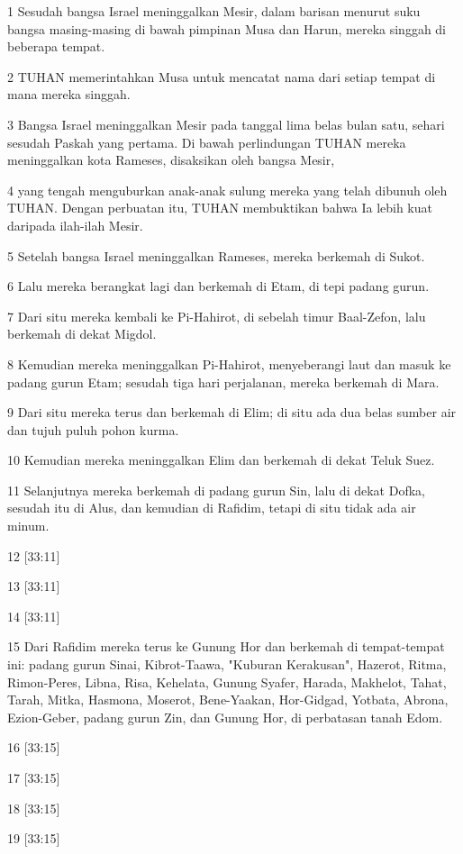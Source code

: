 \par 1 Sesudah bangsa Israel meninggalkan Mesir, dalam barisan menurut suku bangsa masing-masing di bawah pimpinan Musa dan Harun, mereka singgah di beberapa tempat.
\par 2 TUHAN memerintahkan Musa untuk mencatat nama dari setiap tempat di mana mereka singgah.
\par 3 Bangsa Israel meninggalkan Mesir pada tanggal lima belas bulan satu, sehari sesudah Paskah yang pertama. Di bawah perlindungan TUHAN mereka meninggalkan kota Rameses, disaksikan oleh bangsa Mesir,
\par 4 yang tengah menguburkan anak-anak sulung mereka yang telah dibunuh oleh TUHAN. Dengan perbuatan itu, TUHAN membuktikan bahwa Ia lebih kuat daripada ilah-ilah Mesir.
\par 5 Setelah bangsa Israel meninggalkan Rameses, mereka berkemah di Sukot.
\par 6 Lalu mereka berangkat lagi dan berkemah di Etam, di tepi padang gurun.
\par 7 Dari situ mereka kembali ke Pi-Hahirot, di sebelah timur Baal-Zefon, lalu berkemah di dekat Migdol.
\par 8 Kemudian mereka meninggalkan Pi-Hahirot, menyeberangi laut dan masuk ke padang gurun Etam; sesudah tiga hari perjalanan, mereka berkemah di Mara.
\par 9 Dari situ mereka terus dan berkemah di Elim; di situ ada dua belas sumber air dan tujuh puluh pohon kurma.
\par 10 Kemudian mereka meninggalkan Elim dan berkemah di dekat Teluk Suez.
\par 11 Selanjutnya mereka berkemah di padang gurun Sin, lalu di dekat Dofka, sesudah itu di Alus, dan kemudian di Rafidim, tetapi di situ tidak ada air minum.
\par 12 [33:11]
\par 13 [33:11]
\par 14 [33:11]
\par 15 Dari Rafidim mereka terus ke Gunung Hor dan berkemah di tempat-tempat ini: padang gurun Sinai, Kibrot-Taawa, "Kuburan Kerakusan", Hazerot, Ritma, Rimon-Peres, Libna, Risa, Kehelata, Gunung Syafer, Harada, Makhelot, Tahat, Tarah, Mitka, Hasmona, Moserot, Bene-Yaakan, Hor-Gidgad, Yotbata, Abrona, Ezion-Geber, padang gurun Zin, dan Gunung Hor, di perbatasan tanah Edom.
\par 16 [33:15]
\par 17 [33:15]
\par 18 [33:15]
\par 19 [33:15]
